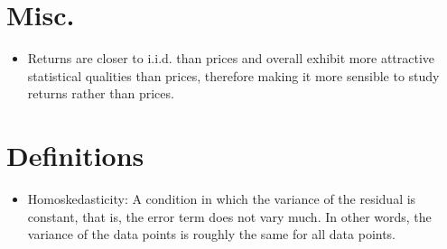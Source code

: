 \documentclass[11pt]{article}
\begin{document}
\section{Misc.}
\begin{itemize}
    \item Returns are closer to i.i.d. than prices and overall exhibit more attractive 
    statistical qualities than prices, therefore making it more sensible to study returns 
    rather than prices. 
\end{itemize}

\section{Definitions}
\begin{itemize}
    \item Homoskedasticity: A condition in which the variance of the residual is constant, that
    is, the error term does not vary much. In other words, the variance of the data points is 
    roughly the same for all data points. 
\end{itemize}
\end{document}
